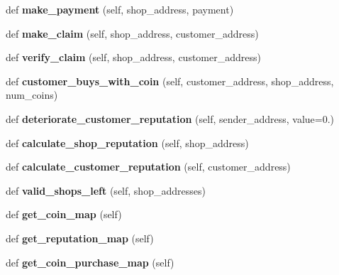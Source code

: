 \begin{DoxyCompactItemize}
def {\bfseries make\+\_\+payment} (self, shop\+\_\+address, payment)
\item 
\mbox{\label{class_smart_contract_1_1_smart_contract_a999674af0040edc43ca9a1162c6826c9}} 
def {\bfseries make\+\_\+claim} (self, shop\+\_\+address, customer\+\_\+address)
\item 
\mbox{\label{class_smart_contract_1_1_smart_contract_a0b3ef2dc581778b62b114a18a6ecf425}} 
def {\bfseries verify\+\_\+claim} (self, shop\+\_\+address, customer\+\_\+address)
\item 
\mbox{\label{class_smart_contract_1_1_smart_contract_a80b5a9c6340aaca1a057fb5cf35aaab7}} 
def {\bfseries customer\+\_\+buys\+\_\+with\+\_\+coin} (self, customer\+\_\+address, shop\+\_\+address, num\+\_\+coins)
\item 
\mbox{\label{class_smart_contract_1_1_smart_contract_a1a93d7800c0da5e4a55a274005bbe88f}} 
def {\bfseries deteriorate\+\_\+customer\+\_\+reputation} (self, sender\+\_\+address, value=0.)
\item 
\mbox{\label{class_smart_contract_1_1_smart_contract_a1a1470aa88eeac677349edfd34fab0f6}} 
def {\bfseries calculate\+\_\+shop\+\_\+reputation} (self, shop\+\_\+address)
\item 
\mbox{\label{class_smart_contract_1_1_smart_contract_a049d23b4a18583bacebd00c52b724897}} 
def {\bfseries calculate\+\_\+customer\+\_\+reputation} (self, customer\+\_\+address)
\item 
\mbox{\label{class_smart_contract_1_1_smart_contract_a6a005188fa4f408363018d54a0db276c}} 
def {\bfseries valid\+\_\+shops\+\_\+left} (self, shop\+\_\+addresses)
\item 
\mbox{\label{class_smart_contract_1_1_smart_contract_a91f5537dbb6289e0232f9ebab8452c39}} 
def {\bfseries get\+\_\+coin\+\_\+map} (self)
\item 
\mbox{\label{class_smart_contract_1_1_smart_contract_adc4fc84cb0886588520ba2c5b8ed9d99}} 
def {\bfseries get\+\_\+reputation\+\_\+map} (self)
\item 
\mbox{\label{class_smart_contract_1_1_smart_contract_ae6470553cb9e3db19765805689c05c7c}} 
def {\bfseries get\+\_\+coin\+\_\+purchase\+\_\+map} (self)
\end{DoxyCompactItemize}
